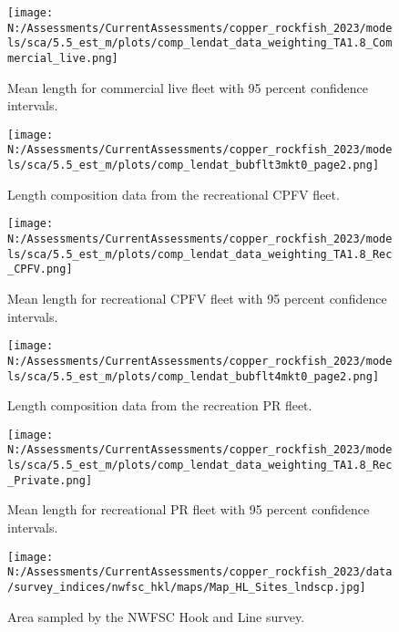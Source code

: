 \documentclass[11pt,
  english,
  letterpaper,
]{article}
\begin{document}
\begin{figure}
\centering
\texttt{[image: N:/Assessments/CurrentAssessments/copper\_rockfish\_2023/models/sca/5.5\_est\_m/plots/comp\_lendat\_data\_weighting\_TA1.8\_Commercial\_live.png]}
\caption{Mean length for commercial live fleet with 95 percent confidence intervals.\label{fig:mean-com-live-len-data}}
\end{figure}

\begin{figure}
\centering
\texttt{[image: N:/Assessments/CurrentAssessments/copper\_rockfish\_2023/models/sca/5.5\_est\_m/plots/comp\_lendat\_bubflt3mkt0\_page2.png]}
\caption{Length composition data from the recreational CPFV fleet.\label{fig:rec-cpfv-len-data}}
\end{figure}

\begin{figure}
\centering
\texttt{[image: N:/Assessments/CurrentAssessments/copper\_rockfish\_2023/models/sca/5.5\_est\_m/plots/comp\_lendat\_data\_weighting\_TA1.8\_Rec\_CPFV.png]}
\caption{Mean length for recreational CPFV fleet with 95 percent confidence intervals.\label{fig:mean-rec-cpfv-len-data}}
\end{figure}

\begin{figure}
\centering
\texttt{[image: N:/Assessments/CurrentAssessments/copper\_rockfish\_2023/models/sca/5.5\_est\_m/plots/comp\_lendat\_bubflt4mkt0\_page2.png]}
\caption{Length composition data from the recreation PR fleet.\label{fig:rec-pr-len-data}}
\end{figure}

\begin{figure}
\centering
\texttt{[image: N:/Assessments/CurrentAssessments/copper\_rockfish\_2023/models/sca/5.5\_est\_m/plots/comp\_lendat\_data\_weighting\_TA1.8\_Rec\_Private.png]}
\caption{Mean length for recreational PR fleet with 95 percent confidence intervals.\label{fig:mean-rec-pr-len-data}}
\end{figure}

\begin{figure}
\centering
\texttt{[image: N:/Assessments/CurrentAssessments/copper\_rockfish\_2023/data/survey\_indices/nwfsc\_hkl/maps/Map\_HL\_Sites\_lndscp.jpg]}
\caption{Area sampled by the NWFSC Hook and Line survey.\label{fig:nwfsc-hkl-map}}
\end{figure}
\end{document}
